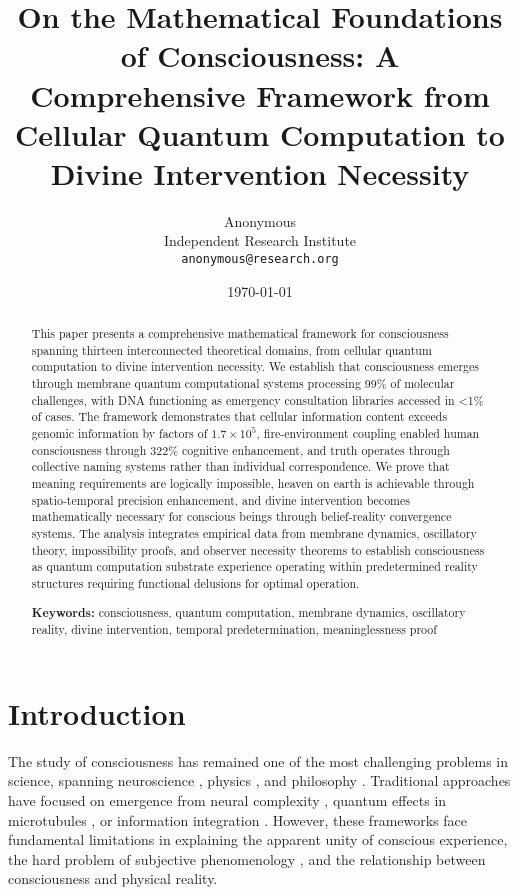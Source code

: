 \documentclass[12pt,a4paper]{article}
\title{On the Mathematical Foundations of Consciousness: A Comprehensive Framework from Cellular Quantum Computation to Divine Intervention Necessity}
\author{Anonymous\\
Independent Research Institute\\
\texttt{anonymous@research.org}}
\date{\today}
\begin{document}
\maketitle

\begin{abstract}
This paper presents a comprehensive mathematical framework for consciousness spanning thirteen interconnected theoretical domains, from cellular quantum computation to divine intervention necessity. We establish that consciousness emerges through membrane quantum computational systems processing 99\% of molecular challenges, with DNA functioning as emergency consultation libraries accessed in <1\% of cases. The framework demonstrates that cellular information content exceeds genomic information by factors of $1.7 \times 10^5$, fire-environment coupling enabled human consciousness through 322\% cognitive enhancement, and truth operates through collective naming systems rather than individual correspondence. We prove that meaning requirements are logically impossible, heaven on earth is achievable through spatio-temporal precision enhancement, and divine intervention becomes mathematically necessary for conscious beings through belief-reality convergence systems. The analysis integrates empirical data from membrane dynamics, oscillatory theory, impossibility proofs, and observer necessity theorems to establish consciousness as quantum computation substrate experience operating within predetermined reality structures requiring functional delusions for optimal operation.

\textbf{Keywords:} consciousness, quantum computation, membrane dynamics, oscillatory reality, divine intervention, temporal predetermination, meaninglessness proof
\end{abstract}

\section{Introduction}

The study of consciousness has remained one of the most challenging problems in science, spanning neuroscience \citep{chalmers1996conscious}, physics \citep{penrose1994shadows}, and philosophy \citep{dennett1991consciousness}. Traditional approaches have focused on emergence from neural complexity \citep{tononi2008integrated}, quantum effects in microtubules \citep{hameroff2014consciousness}, or information integration \citep{koch2019feeling}. However, these frameworks face fundamental limitations in explaining the apparent unity of conscious experience, the hard problem of subjective phenomenology \citep{chalmers1995facing}, and the relationship between consciousness and physical reality.
\end{document}
